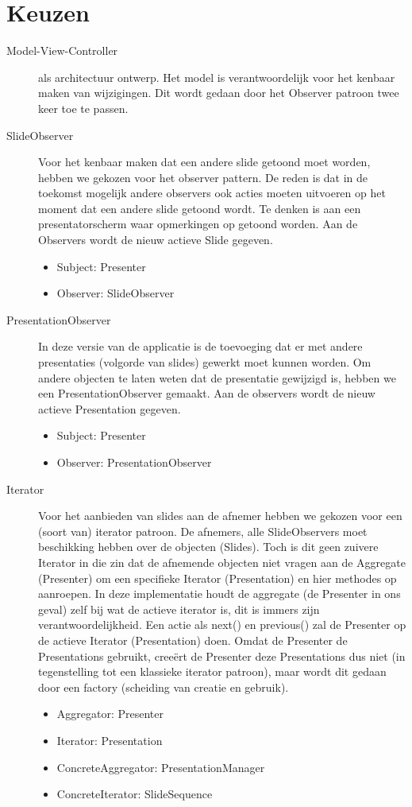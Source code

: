 \documentclass[a4paper]{article}
\begin{document}
\section{Keuzen}
\begin{description}
\item[Model-View-Controller] als architectuur ontwerp. Het model is verantwoordelijk voor het kenbaar maken van wijzigingen. Dit wordt gedaan door het Observer patroon twee keer toe te passen.
\item[SlideObserver] Voor het kenbaar maken dat een andere slide getoond moet worden, hebben we gekozen voor het observer pattern. De reden is dat in de toekomst mogelijk andere observers ook acties moeten uitvoeren op het moment dat een andere slide getoond wordt. Te denken is aan een presentatorscherm waar opmerkingen op getoond worden. Aan de Observers wordt de nieuw actieve Slide gegeven.
\begin{itemize}
\item Subject: Presenter
\item Observer: SlideObserver
\end{itemize}
\item[PresentationObserver] In deze versie van de applicatie is de toevoeging dat er met andere presentaties (volgorde van slides) gewerkt moet kunnen worden. Om andere objecten te laten weten dat de presentatie gewijzigd is, hebben we een PresentationObserver gemaakt. Aan de observers wordt de nieuw actieve Presentation gegeven.
\begin{itemize}
\item Subject: Presenter
\item Observer: PresentationObserver
\end{itemize}
\item[Iterator] Voor het aanbieden van slides aan de afnemer hebben we gekozen voor een (soort van) iterator patroon. De afnemers, alle SlideObservers moet beschikking hebben over de objecten (Slides). Toch is dit geen zuivere Iterator in die zin dat de afnemende objecten niet vragen aan de Aggregate (Presenter) om een specifieke Iterator (Presentation) en hier methodes op aanroepen. In deze implementatie houdt de aggregate (de Presenter in ons geval) zelf bij wat de actieve iterator is, dit is immers zijn verantwoordelijkheid. Een actie als next() en previous() zal de Presenter op de actieve Iterator (Presentation) doen. Omdat de Presenter de Presentations gebruikt, creeërt de Presenter deze Presentations dus niet (in tegenstelling tot een klassieke iterator patroon), maar wordt dit gedaan door een factory (scheiding van creatie en gebruik).
\begin{itemize}
\item Aggregator: Presenter
\item Iterator: Presentation
\item ConcreteAggregator: PresentationManager
\item ConcreteIterator: SlideSequence
\end{itemize}


\end{description}
\end{document}
